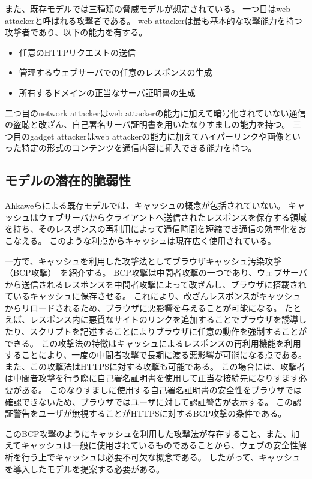 \documentclass{css}
\begin{document}
また、既存モデルでは三種類の脅威モデルが想定されている。
一つ目はweb attackerと呼ばれる攻撃者である。
web attackerは最も基本的な攻撃能力を持つ攻撃者であり、以下の能力を有する。
\begin{itemize}
\item 任意のHTTPリクエストの送信
\item 管理するウェブサーバでの任意のレスポンスの生成
\item 所有するドメインの正当なサーバ証明書の生成
\end{itemize}
二つ目のnetwork attackerはweb attackerの能力に加えて暗号化されていない通信の盗聴と改ざん、自己署名サーバ証明書を用いたなりすましの能力を持つ。
三つ目のgadget attackerはweb attackerの能力に加えてハイパーリンクや画像といった特定の形式のコンテンツを通信内容に挿入できる能力を持つ。

\subsection{モデルの潜在的脆弱性}
\label{sec:problem}
Ahkaweらによる既存モデル\cite{webmodel}では、キャッシュの概念が包括されていない。
キャッシュはウェブサーバからクライアントへ送信されたレスポンスを保存する領域を持ち、そのレスポンスの再利用によって通信時間を短縮でき通信の効率化をおこなえる。
このような利点からキャッシュは現在広く使用されている。

一方で、キャッシュを利用した攻撃法としてブラウザキャッシュ汚染攻撃（BCP攻撃）~\cite{bcpattack}を紹介する。
BCP攻撃は中間者攻撃の一つであり、ウェブサーバから送信されるレスポンスを中間者攻撃によって改ざんし、ブラウザに搭載されているキャッシュに保存させる。
これにより、改ざんレスポンスがキャッシュからリロードされるため、ブラウザに悪影響を与えることが可能になる。
たとえば、レスポンス内に悪質なサイトのリンクを追加することでブラウザを誘導したり、スクリプトを記述することによりブラウザに任意の動作を強制することができる。
この攻撃法の特徴はキャッシュによるレスポンスの再利用機能を利用することにより、一度の中間者攻撃で長期に渡る悪影響が可能になる点である。
また、この攻撃法はHTTPSに対する攻撃も可能である。
この場合には、攻撃者は中間者攻撃を行う際に自己署名証明書を使用して正当な接続先になりすます必要がある。
このなりすましに使用する自己署名証明書の安全性をブラウザでは確認できないため、ブラウザではユーザに対して認証警告が表示する。
この認証警告をユーザが無視することがHTTPSに対するBCP攻撃の条件である。

このBCP攻撃のようにキャッシュを利用した攻撃法が存在すること、また、加えてキャッシュは一般に使用されているものであることから、ウェブの安全性解析を行う上でキャッシュは必要不可欠な概念である。
したがって、キャッシュを導入したモデルを提案する必要がある。
\end{document}

